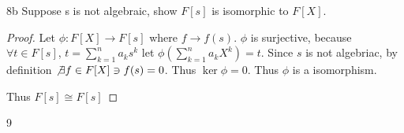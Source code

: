 \documentclass{article}
\begin{document}
\begin{PROB}{8b}\label{Problem 8b.}
    Suppose s is not algebraic, show $F[s]$ is isomorphic to $F[X]$.
\end{PROB}
\begin{proof}
    Let $\phi: F[X] \to F[s]$ where $f \to f(s)$. $\phi$ is surjective, because $\forall t \in F[s]$, $t = \sum_{k = 1}^{n}a_k s^k$ let $\phi(\sum_{k = 1}^{n}a_k X^k) = t$. Since $s$ is not algebriac, by definition $\not \exists f \in F[X] \ni f(s) = 0$. Thus $\ker \phi = 0$. Thus $\phi$ is a isomorphism.
    
    Thus $F[s] \cong F[s]$ 
\end{proof}

\bigskip

\begin{PROB}{9}\label{Problem 9.}
\end{PROB}
\end{document}
